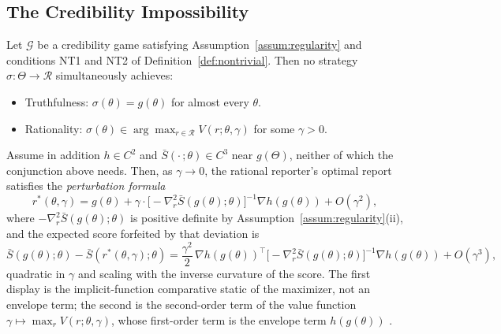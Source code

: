 \documentclass[acmsmall,nonacm,screen]{acmart}
\theoremstyle{acmplain}%
\theoremstyle{acmdefinition}%
\newcommand{\calG}{\mathcal{G}}
\newcommand{\calR}{\mathcal{R}}
\newcommand{\Sbar}{\bar{S}}
\numberwithin{equation}{section}
\begin{document}
\subsection{The Credibility Impossibility}

\begin{theorem}\label{thm:impossibility}
Let $\calG$ be a credibility game satisfying Assumption~\ref{assum:regularity} and conditions NT1 and NT2 of Definition~\ref{def:nontrivial}. Then no strategy $\sigma: \Theta \to \calR$ simultaneously achieves:
\begin{itemize}
\item[\textbf{(T)}] Truthfulness: $\sigma(\theta) = g(\theta)$ for almost every $\theta$.
\item[\textbf{(R)}] Rationality: $\sigma(\theta) \in \arg\max_{r \in \calR} V(r;\theta,\gamma)$ for some $\gamma > 0$.
\end{itemize}
Assume in addition $h \in C^2$ and $\Sbar(\cdot\,;\theta) \in C^3$ near $g(\Theta)$, neither of which the conjunction above needs. Then, as $\gamma \to 0$, the rational reporter's optimal report satisfies the \emph{perturbation formula}
\begin{equation}\label{eq:perturbation-formula}
r^*(\theta,\gamma) = g(\theta) + \gamma \cdot
\bigl[-\nabla^2_r \Sbar(g(\theta);\theta)\bigr]^{-1} \nabla h(g(\theta))
+ O(\gamma^2),
\end{equation}
where $-\nabla^2_r \Sbar(g(\theta);\theta)$ is positive definite by Assumption~\ref{assum:regularity}(ii), and the expected score forfeited by that deviation is
\begin{equation}\label{eq:scoring-loss}
\Sbar(g(\theta);\theta) - \Sbar(r^*(\theta,\gamma);\theta) =
\frac{\gamma^2}{2}\, \nabla h(g(\theta))^\top
\bigl[-\nabla^2_r \Sbar(g(\theta);\theta)\bigr]^{-1} \nabla h(g(\theta))
+ O(\gamma^3),
\end{equation}
quadratic in $\gamma$ and scaling with the inverse curvature of the score. The first display is the implicit-function comparative static of the maximizer, not an envelope term; the second is the second-order term of the value function $\gamma \mapsto \max_r V(r;\theta,\gamma)$, whose first-order term is the envelope term $h(g(\theta))$ \citep{milgrom2002envelope}.
\end{theorem}
\end{document}
